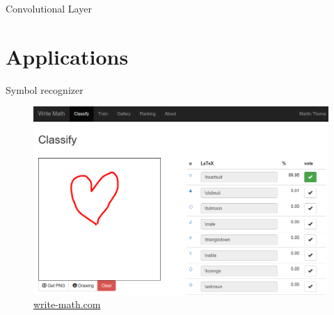 \documentclass{beamer}
\begin{document}
\begin{frame}{Convolutional Layer}
\begin{figure}[ht]
    \centering
    
\end{figure}
\end{frame}


\section{Applications}
\begin{frame}{Symbol recognizer}
\begin{figure}[ht]
    \centering
    \includegraphics[width=0.8\paperwidth, height=0.7\paperheight, keepaspectratio]{graphics/symbol-recognizer.png}
    \captionsetup{labelformat=empty}
    \caption{\href{http://write-math.com}{write-math.com}}
\end{figure}
\end{frame}

\end{document}
